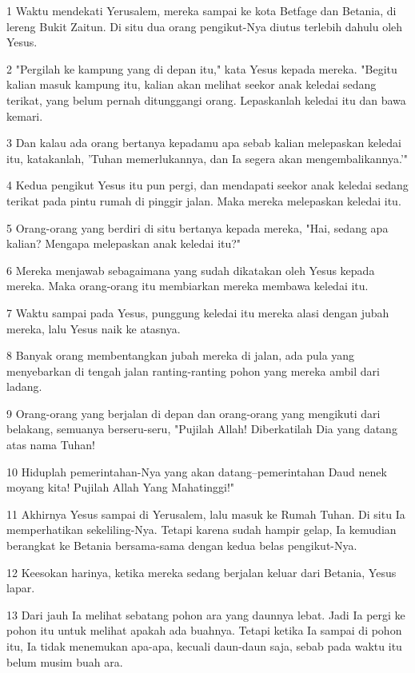 \par 1 Waktu mendekati Yerusalem, mereka sampai ke kota Betfage dan Betania, di lereng Bukit Zaitun. Di situ dua orang pengikut-Nya diutus terlebih dahulu oleh Yesus.
\par 2 "Pergilah ke kampung yang di depan itu," kata Yesus kepada mereka. "Begitu kalian masuk kampung itu, kalian akan melihat seekor anak keledai sedang terikat, yang belum pernah ditunggangi orang. Lepaskanlah keledai itu dan bawa kemari.
\par 3 Dan kalau ada orang bertanya kepadamu apa sebab kalian melepaskan keledai itu, katakanlah, 'Tuhan memerlukannya, dan Ia segera akan mengembalikannya.'"
\par 4 Kedua pengikut Yesus itu pun pergi, dan mendapati seekor anak keledai sedang terikat pada pintu rumah di pinggir jalan. Maka mereka melepaskan keledai itu.
\par 5 Orang-orang yang berdiri di situ bertanya kepada mereka, "Hai, sedang apa kalian? Mengapa melepaskan anak keledai itu?"
\par 6 Mereka menjawab sebagaimana yang sudah dikatakan oleh Yesus kepada mereka. Maka orang-orang itu membiarkan mereka membawa keledai itu.
\par 7 Waktu sampai pada Yesus, punggung keledai itu mereka alasi dengan jubah mereka, lalu Yesus naik ke atasnya.
\par 8 Banyak orang membentangkan jubah mereka di jalan, ada pula yang menyebarkan di tengah jalan ranting-ranting pohon yang mereka ambil dari ladang.
\par 9 Orang-orang yang berjalan di depan dan orang-orang yang mengikuti dari belakang, semuanya berseru-seru, "Pujilah Allah! Diberkatilah Dia yang datang atas nama Tuhan!
\par 10 Hiduplah pemerintahan-Nya yang akan datang--pemerintahan Daud nenek moyang kita! Pujilah Allah Yang Mahatinggi!"
\par 11 Akhirnya Yesus sampai di Yerusalem, lalu masuk ke Rumah Tuhan. Di situ Ia memperhatikan sekeliling-Nya. Tetapi karena sudah hampir gelap, Ia kemudian berangkat ke Betania bersama-sama dengan kedua belas pengikut-Nya.
\par 12 Keesokan harinya, ketika mereka sedang berjalan keluar dari Betania, Yesus lapar.
\par 13 Dari jauh Ia melihat sebatang pohon ara yang daunnya lebat. Jadi Ia pergi ke pohon itu untuk melihat apakah ada buahnya. Tetapi ketika Ia sampai di pohon itu, Ia tidak menemukan apa-apa, kecuali daun-daun saja, sebab pada waktu itu belum musim buah ara.
